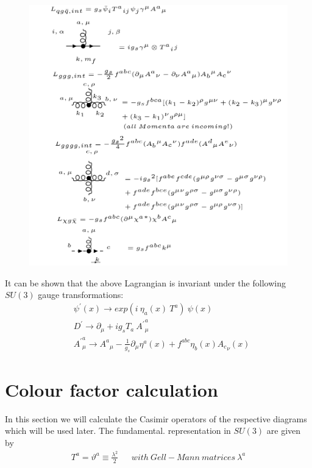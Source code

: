 \begin{figure}[h!]
\hspace{-1cm}
\includegraphics[scale=0.7]{images/Intro/Lint.png}
\end{figure}
It can be shown that the above Lagrangian is invariant under the following $ SU(3) $ gauge transformations:
\begin{equation}
\begin{split}
&{\psi}^{\prime}(x) \rightarrow exp(i \:\eta_a(x) \:T^a) \:\psi(x)\\
&{D}^{\prime} \rightarrow \partial_\mu+ig_sT_a\: {{A}^{\prime}}^a_{\mu } \\
&{{A}^{\prime}}^a_{\mu }\rightarrow  {A^a}_{\mu}- \frac{1}{g_s}\partial_\mu \eta^a(x)+ f^{abc} \eta_{b}(x) {A_c}_{\nu}(x)
\end{split}
\end{equation}

\newpage
\section{Colour factor calculation}
In this section we will calculate the Casimir operators of the respective diagrams which will be used later. The fundamental. representation in $ SU(3) $ are given by\cite{Schwartz:2013pla, Platzer:2018pmd}
\begin{equation}
\begin{split}
T^a = \vartheta^a \equiv \frac{\lambda ^2}{2} \:\:\:\:\:\:\: \mathit{with\: Gell-Mann\: matrices\: \lambda ^a}
\end{split}
\end{equation}

